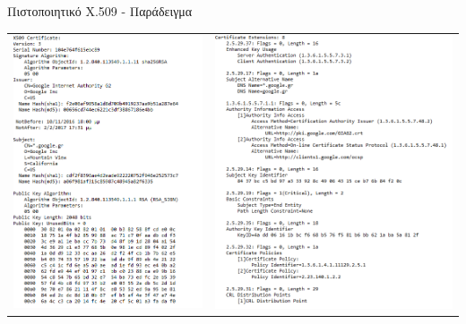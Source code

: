 \documentclass{beamer}
\begin{document}
\begin{frame}{Πιστοποιητικό X.509 - Παράδειγμα} 
    \begin{tabular}{ c c }
    \includegraphics[scale=0.41]{cer1.PNG} & \includegraphics[scale=0.41]{cer2.PNG}
    \end{tabular}  
\end{frame}
\end{document}
